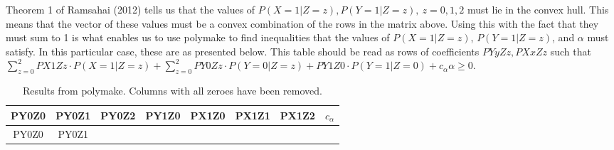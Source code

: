 \documentclass[
]{article}
\theoremstyle{plain}
\begin{document}
Theorem 1 of Ramsahai (2012) tells us that the values of \(P(X = 1 | Z = z), P(Y = 1 | Z = z),\ z = 0,1,2\) must lie in the convex hull. This means that the vector of these values must be a convex combination of the rows in the matrix above. Using this with the fact that they must sum to 1 is what enables us to use polymake to find inequalities that the values of \(P(X = 1 | Z = z)\), \(P(Y = 1 | Z = z)\), and \(\alpha\) must satisfy. In this particular case, these are as presented below. This table should be read as rows of coefficients \(PYyZz, PXxZz\) such that \(\sum_{z = 0}^2 PX1Zz \cdot P(X = 1 | Z = z) + \sum_{z = 0}^2 PY0Zz\cdot P(Y = 0 | Z = z) + PY1Z0\cdot P(Y = 1 | Z = 0) + c_\alpha \alpha \ge 0\).

\begin{longtable}[]{@{}cccccccc@{}}
\caption{Results from polymake. Columns with all zeroes have been removed.}\tabularnewline
\toprule
\begin{minipage}[b]{0.09\columnwidth}\centering
PY0Z0\strut
\end{minipage} & \begin{minipage}[b]{0.09\columnwidth}\centering
PY0Z1\strut
\end{minipage} & \begin{minipage}[b]{0.09\columnwidth}\centering
PY0Z2\strut
\end{minipage} & \begin{minipage}[b]{0.09\columnwidth}\centering
PY1Z0\strut
\end{minipage} & \begin{minipage}[b]{0.09\columnwidth}\centering
PX1Z0\strut
\end{minipage} & \begin{minipage}[b]{0.09\columnwidth}\centering
PX1Z1\strut
\end{minipage} & \begin{minipage}[b]{0.09\columnwidth}\centering
PX1Z2\strut
\end{minipage} & \begin{minipage}[b]{0.16\columnwidth}\centering
\(c_{\alpha}\)\strut
\end{minipage}\tabularnewline
\midrule
\endfirsthead
\toprule
\begin{minipage}[b]{0.09\columnwidth}\centering
PY0Z0\strut
\end{minipage} & \begin{minipage}[b]{0.09\columnwidth}\centering
PY0Z1\strut
\end{minipage} & \begin{minipage}[b]{0.09\columnwidth}\centering

\end{minipage}
\end{longtable}
\end{document}

